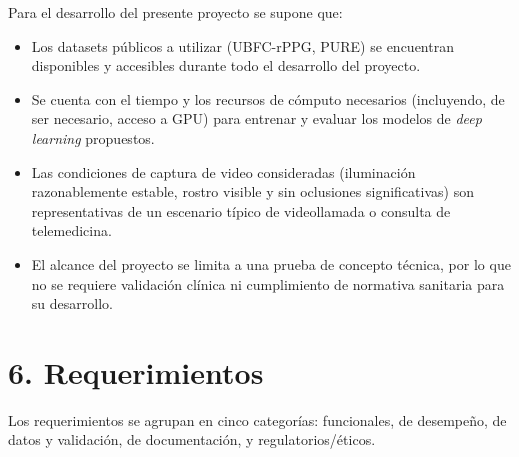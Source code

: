 \documentclass[
11pt, %
]{charter}
\begin{document}
	Para el desarrollo del presente proyecto se supone que:
	
	\begin{itemize}
		\item Los datasets públicos a utilizar (UBFC-rPPG, PURE) se encuentran disponibles y accesibles durante todo el desarrollo del proyecto.
		\item Se cuenta con el tiempo y los recursos de cómputo necesarios (incluyendo, de ser necesario, acceso a GPU) para entrenar y evaluar los modelos de \textit{deep learning} propuestos.
		\item Las condiciones de captura de video consideradas (iluminación razonablemente estable, rostro visible y sin oclusiones significativas) son representativas de un escenario típico de videollamada o consulta de telemedicina.
		\item El alcance del proyecto se limita a una prueba de concepto técnica, por lo que no se requiere validación clínica ni cumplimiento de normativa sanitaria para su desarrollo.
	\end{itemize}
	
	
	\section{6. Requerimientos}
	\label{sec:requerimientos}
	
	Los requerimientos se agrupan en cinco categorías: funcionales, de desempeño, de datos y validación, de documentación, y regulatorios/éticos.
	
\end{document}
